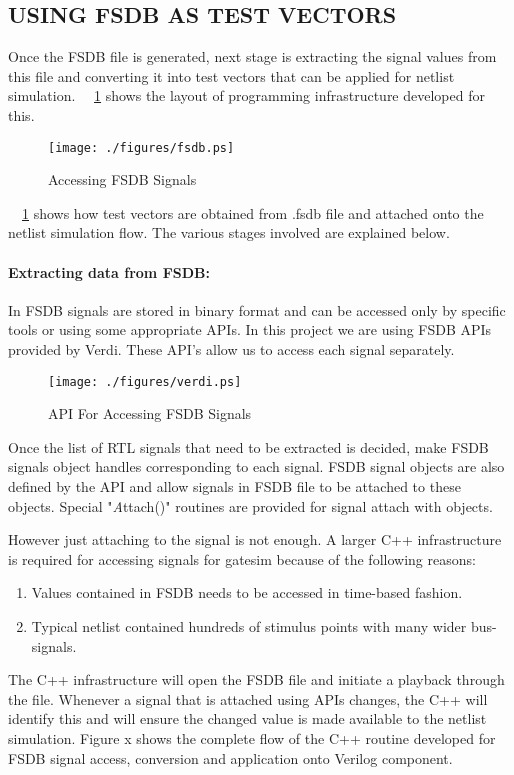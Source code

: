\subsection{USING FSDB AS TEST VECTORS}
Once the FSDB file is generated, next stage is extracting the signal values from this file and converting it into test vectors that can be applied for netlist simulation.  ~\figurename{~\ref{fig:fsdb.ps}} shows the layout of programming infrastructure developed for this.

\begin{figure}[h]
\centering
\texttt{[image: ./figures/fsdb.ps]}
\caption{Accessing FSDB Signals}
\label{fig:fsdb.ps}
\end{figure}

~\figurename{~\ref{fig:fsdb.ps}} shows how test vectors are obtained from .fsdb file and attached onto the netlist simulation flow. The various stages involved are explained below.

\paragraph{Extracting data from FSDB:}In FSDB signals are stored in binary format and can be accessed only by specific tools or using some appropriate APIs.  In this project we are using FSDB APIs provided by Verdi. These API's allow us to access each signal separately. 


\begin{figure}[h]
\centering
\texttt{[image: ./figures/verdi.ps]}
\caption{API For Accessing FSDB Signals}
\label{fig:verdi.eps}
\end{figure}






Once the list of RTL signals that need to be extracted is decided, make FSDB signals object handles corresponding to each signal. FSDB signal objects are also defined by the API and allow signals in FSDB file to be attached to these objects. Special "{\emph Attach()}" routines are provided for signal attach with objects.

However just attaching to the signal is not enough. A larger C++ infrastructure is required for accessing signals for gatesim because of the following reasons:
\begin{enumerate}
\item Values contained in FSDB needs to be accessed in time-based fashion.
\item Typical netlist contained hundreds of stimulus points with many wider bus-signals.
\end{enumerate}
The C++ infrastructure will open the FSDB file and initiate a playback through the file. Whenever a signal that is attached using APIs changes, the C++ will identify this and will ensure the changed value is made available to the netlist simulation.  Figure x shows the complete flow of the C++ routine developed for FSDB signal access, conversion and application onto Verilog component.


